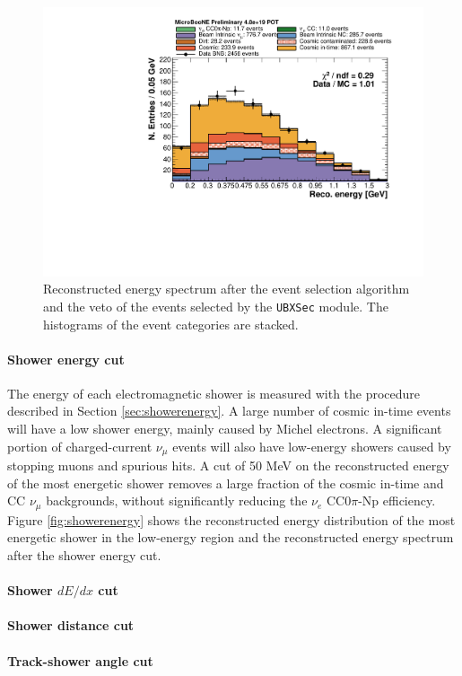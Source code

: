 \documentclass[a4paper]{article}
\begin{document}
\begin{figure}[htbp]
\centering
  \includegraphics[width=0.7\linewidth]{figures/h_fixed_energy.pdf}
  \caption{Reconstructed energy spectrum after the event selection algorithm and the veto of the events selected by the \texttt{UBXSec} module. The histograms of the event categories are stacked.}
  \label{fig:spectrum}
\end{figure}

\paragraph{Shower energy cut}
The energy of each electromagnetic shower is measured with the procedure described in Section \ref{sec:showerenergy}. A large number of cosmic in-time events will have a low shower energy, mainly caused by Michel electrons. A significant portion of charged-current $\nu_{\mu}$ events will also have low-energy showers caused by stopping muons and spurious hits. A cut of 50 MeV on the reconstructed energy of the most energetic shower removes a large fraction of the cosmic in-time and CC $\nu_{\mu}$ backgrounds, without significantly reducing the $\nu_{e}$ CC0$\pi$-Np efficiency. Figure \ref{fig:showerenergy} shows the reconstructed energy distribution of the most energetic shower in the low-energy region and the reconstructed energy spectrum after the shower energy cut.

\paragraph{Shower $dE/dx$ cut}

\paragraph{Shower distance cut}

\paragraph{Track-shower angle cut}
\end{document}
